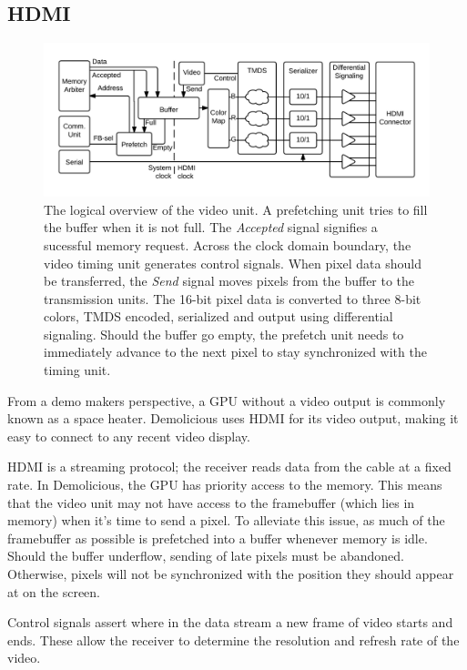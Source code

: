 \documentclass[../main/report.tex]{subfiles}
\begin{document}
\subsection{HDMI}
\begin{figure}
	\centering
	\includegraphics[width=\textwidth]{diagrams/HDMI_overview.png}
	\caption{
		The logical overview of the video unit.
		A prefetching unit tries to fill the buffer when it is not full.
		The \emph{Accepted} signal signifies a sucessful memory request.
		Across the clock domain boundary, the video timing unit generates control signals.
		When pixel data should be transferred, the \emph{Send} signal moves pixels from the buffer to the transmission units.
		The 16-bit pixel data is converted to three 8-bit colors, TMDS encoded, serialized and output using differential signaling.
		Should the buffer go empty, the prefetch unit needs to immediately advance to the next pixel to stay synchronized with the timing unit.
	}
	\label{fig:video_unit}
\end{figure}
From a demo makers perspective, a GPU without a video output is commonly known as a space heater.
Demolicious uses HDMI for its video output, making it easy to connect to any recent video display.

HDMI is a streaming protocol; the receiver reads data from the cable at a fixed rate.
In Demolicious, the GPU has priority access to the memory.
This means that the video unit may not have access to the framebuffer (which lies in memory) when it's time to send a pixel.
To alleviate this issue, as much of the framebuffer as possible is prefetched into a buffer whenever memory is idle.
Should the buffer underflow, sending of late pixels must be abandoned.
Otherwise, pixels will not be synchronized with the position they should appear at on the screen.

Control signals assert where in the data stream a new frame of video starts and ends.
These allow the receiver to determine the resolution and refresh rate of the video.
\end{document}
